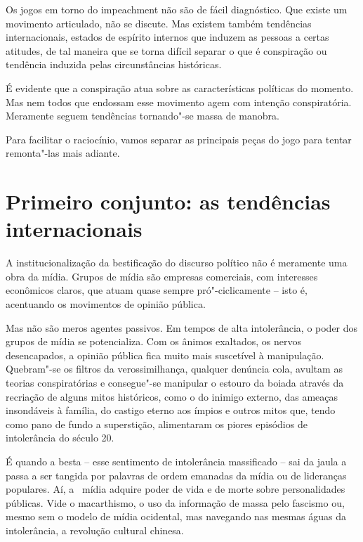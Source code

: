  

Os jogos em torno do impeachment não são de fácil diagnóstico. Que
existe um movimento articulado, não se discute. Mas existem também
tendências internacionais, estados de espírito internos que induzem as
pessoas a certas atitudes, de tal maneira que se torna difícil separar o
que é conspiração ou tendência induzida pelas circunstâncias históricas.

É evidente que a conspiração atua sobre as características políticas do
momento. Mas nem todos que endossam esse movimento agem com intenção
conspiratória. Meramente seguem tendências tornando"-se massa de manobra.

Para facilitar o raciocínio, vamos separar as principais peças do jogo
para tentar remonta"-las mais adiante.

\section{Primeiro conjunto: as tendências internacionais}

A institucionalização da bestificação do discurso político não é
meramente uma obra da mídia. Grupos de mídia são empresas comerciais,
com interesses econômicos claros, que atuam quase sempre
pró"-ciclicamente -- isto é, acentuando os movimentos de opinião pública.

Mas não são meros agentes passivos. Em tempos de alta intolerância, o
poder dos grupos de mídia se potencializa. Com os ânimos exaltados, os
nervos desencapados, a opinião pública fica muito mais suscetível à
manipulação. Quebram"-se os filtros da verossimilhança, qualquer denúncia
cola, avultam as teorias conspiratórias e consegue"-se manipular o
estouro da boiada através da recriação de alguns mitos históricos, como
o do inimigo externo, das ameaças insondáveis à família, do castigo
eterno aos ímpios e outros mitos que, tendo como pano de fundo a
superstição, alimentaram os piores episódios de intolerância do século
20.

É quando a besta -- esse sentimento de intolerância massificado -- sai
da jaula a passa a ser tangida por palavras de ordem emanadas da mídia
ou de lideranças populares. Aí, a ~mídia adquire poder de vida e de
morte sobre personalidades públicas. Vide o macarthismo, o uso da
informação de massa pelo fascismo ou, mesmo sem o modelo de mídia
ocidental, mas navegando nas mesmas águas da intolerância, a revolução
cultural chinesa.

